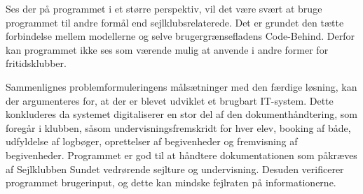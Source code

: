 Ses der på programmet i et større perspektiv, vil det være svært at bruge programmet til andre formål end sejlklubsrelaterede. 
Det er grundet den tætte forbindelse mellem modellerne og selve brugergrænsefladens Code-Behind. 
Derfor kan programmet ikke ses som værende mulig at anvende i andre former for fritidsklubber. 

Sammenlignes problemformuleringens målsætninger med den færdige løsning, kan der argumenteres for, at der er blevet udviklet et brugbart IT-system. 
Dette konkluderes da systemet digitaliserer en stor del af den dokumenthåndtering, som foregår i klubben, såsom undervisningsfremskridt for hver elev, booking af både, udfyldelse af logbøger, oprettelser af begivenheder og fremvisning af begivenheder.
Programmet er god til at håndtere dokumentationen som påkræves af Sejlklubben Sundet vedrørende sejlture og undervisning.
Desuden verificerer programmet brugerinput, og dette kan mindske fejlraten på informationerne.